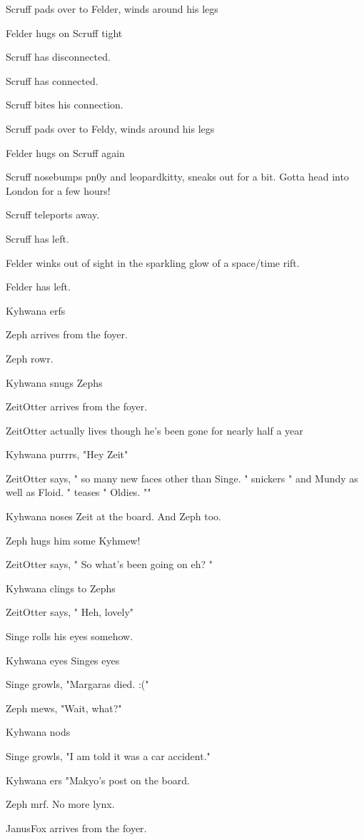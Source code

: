 Scruff pads over to Felder, winds around his legs

Felder hugs on Scruff tight

Scruff has disconnected.

Scruff has connected.

Scruff bites his connection.

Scruff pads over to Feldy, winds around his legs

Felder hugs on Scruff again

Scruff nosebumps pn0y and leopardkitty, sneaks out for a bit. Gotta head into London for a few hours!

Scruff teleports away.

Scruff has left.

Felder winks out of sight in the sparkling glow of a space/time rift.

Felder has left.

Kyhwana erfs

Zeph arrives from the foyer.

Zeph rowr.

Kyhwana snugs Zephs

ZeitOtter arrives from the foyer.

ZeitOtter actually lives though he's been gone for nearly half a year

Kyhwana purrrs, "Hey Zeit"

ZeitOtter says, " so many new faces other than Singe. " snickers " and Mundy as well as Floid. " teases " Oldies. ""

Kyhwana noses Zeit at the board. And Zeph too.

Zeph hugs him some Kyhmew!

ZeitOtter says, " So what's been going on eh? "

Kyhwana clings to Zephs

ZeitOtter says, " Heh, lovely"

Singe rolls his eyes somehow.

Kyhwana eyes Singes eyes

Singe growls, "Margaras died. :("

Zeph mews, "Wait, what?"

Kyhwana nods

Singe growls, "I am told it was a car accident."

Kyhwana ers "Makyo's post on the board.

Zeph mrf. No more lynx.

JanusFox arrives from the foyer.

